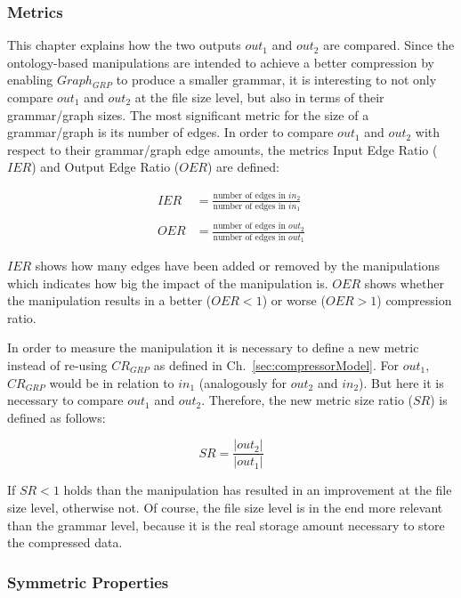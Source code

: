 \subsubsection{Metrics}

This chapter explains how the two outputs $out_1$ and $out_2$ are compared. Since the ontology-based manipulations are intended to achieve a better compression by enabling $Graph_{GRP}$ to produce a smaller grammar, it is interesting to not only compare $out_1$ and $out_2$ at the file size level, but also in terms of their grammar/graph sizes. The most significant metric for the size of a grammar/graph is its number of edges. In order to compare $out_1$ and $out_2$ with respect to their grammar/graph edge amounts, the metrics Input Edge Ratio ($IER$) and Output Edge Ratio ($OER$)  are defined: 

\begin{align*}
IER&=\frac {\text{number of edges in } in_2} {\text{number of edges in  } in_1}
\\\\
OER&=\frac {\text{number of edges in } out_2} {\text{number of edges in } out_1}
 \end{align*}
 
$IER$ shows how many edges have been added or removed by the manipulations which indicates how big the impact of the manipulation is. $OER$  shows whether the manipulation results in a better ($OER<1$) or worse ($OER>1$) compression ratio.

In order to measure the manipulation it is necessary to define a new metric instead of re-using $CR_{GRP}$ as defined in Ch.~\ref{sec:compressorModel}. For $out_1$, $CR_{GRP}$ would be in relation to $in_1$ (analogously for $out_2$ and $in_2$). But here it is necessary to compare $out_1$ and $out_2$. Therefore, the new metric size ratio ($SR$) is defined as follows:

 \[
SR=\frac {|out_2|} {|out_1|}
\]

If $SR<1$ holds than the manipulation has resulted in an improvement at the file size level, otherwise not. Of course, the file size level is in the end more relevant than the grammar level, because it is the real storage amount necessary to store the compressed data.



\subsubsection{Symmetric Properties}

